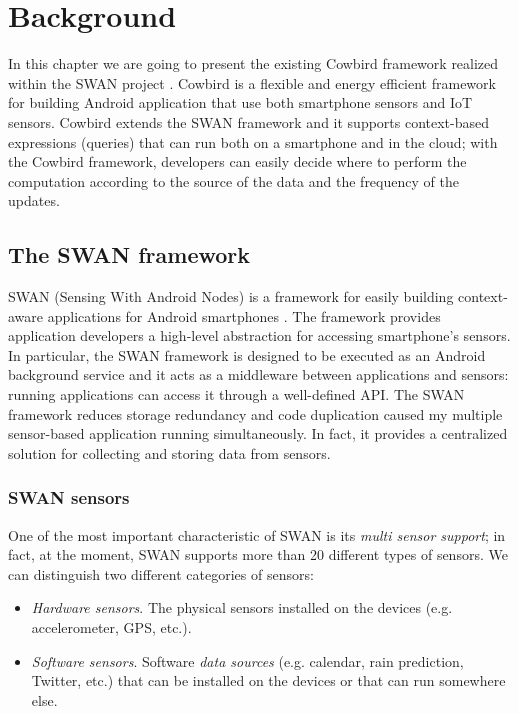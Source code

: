 \chapter{Background}

In this chapter we are going to present the existing Cowbird framework realized within the SWAN project \cite{swanonline}. Cowbird is a flexible and energy efficient framework for building Android application that use both smartphone sensors and IoT sensors\cite{cowbirdarticle}. Cowbird extends the SWAN framework \cite{swanphd} and it supports context-based expressions (queries) that can run both on a smartphone and in the cloud; with the Cowbird framework, developers can easily decide where to perform the computation according to the source of the data and the frequency of the updates.

\section{The SWAN framework}
SWAN (Sensing With Android Nodes) is a framework for easily building context-aware applications for Android smartphones \cite{swanphd}. The framework provides application developers a high-level abstraction for accessing smartphone's sensors. In particular, the SWAN framework is designed to be executed as an Android background service and it acts as a middleware between applications and sensors: running applications can access it through a well-defined API. The SWAN framework reduces storage redundancy and code duplication caused my multiple sensor-based application running simultaneously. In fact, it provides a centralized solution for collecting and storing data from sensors. 

\subsection{SWAN sensors}
One of the most important characteristic of SWAN is its \emph{multi sensor support}; in fact, at the moment, SWAN supports more than 20 different types of sensors. We can distinguish two different categories of sensors:
\begin{itemize}
\item	 \emph{Hardware sensors}. The physical sensors installed on the devices (e.g. accelerometer, GPS, etc.).
\item \emph{Software sensors}. Software \emph{data sources} (e.g. calendar, rain prediction, Twitter, etc.) that can be installed on the devices or that can run somewhere else. 
\end{itemize}

